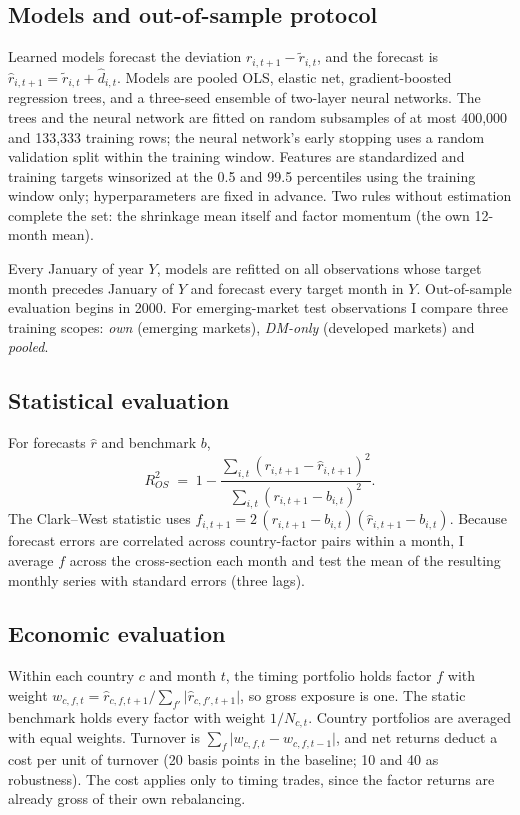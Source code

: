 \documentclass[11pt]{article}
\begin{document}
\subsection{Models and out-of-sample protocol}
Learned models forecast the deviation $r_{i,t+1} - \tilde r_{i,t}$, and the forecast is $\hat r_{i,t+1} = \tilde r_{i,t} + \hat d_{i,t}$. Models are pooled OLS, elastic net, gradient-boosted regression trees, and a three-seed ensemble of two-layer neural networks. The trees and the neural network are fitted on random subsamples of at most 400,000 and 133,333 training rows; the neural network's early stopping uses a random validation split within the training window. Features are standardized and training targets winsorized at the 0.5 and 99.5 percentiles using the training window only; hyperparameters are fixed in advance. Two rules without estimation complete the set: the shrinkage mean itself and factor momentum (the own 12-month mean).

Every January of year $Y$, models are refitted on all observations whose target month precedes January of $Y$ and forecast every target month in $Y$. Out-of-sample evaluation begins in 2000. For emerging-market test observations I compare three training scopes: \emph{own} (emerging markets), \emph{DM-only} (developed markets) and \emph{pooled}.

\subsection{Statistical evaluation}
For forecasts $\hat r$ and benchmark $b$,
\begin{equation}
R^2_{OS} \;=\; 1 - \frac{\sum_{i,t}\left(r_{i,t+1}-\hat r_{i,t+1}\right)^2}{\sum_{i,t}\left(r_{i,t+1}-b_{i,t}\right)^2}.
\end{equation}
The Clark--West statistic uses $f_{i,t+1} = 2\,(r_{i,t+1}-b_{i,t})(\hat r_{i,t+1}-b_{i,t})$. Because forecast errors are correlated across country-factor pairs within a month, I average $f$ across the cross-section each month and test the mean of the resulting monthly series with \citet{newey1987simple} standard errors (three lags).

\subsection{Economic evaluation}
Within each country $c$ and month $t$, the timing portfolio holds factor $f$ with weight $w_{c,f,t} = \hat r_{c,f,t+1} / \sum_{f'} \lvert \hat r_{c,f',t+1} \rvert$, so gross exposure is one. The static benchmark holds every factor with weight $1/N_{c,t}$. Country portfolios are averaged with equal weights. Turnover is $\sum_f \lvert w_{c,f,t} - w_{c,f,t-1} \rvert$, and net returns deduct a cost per unit of turnover (20 basis points in the baseline; 10 and 40 as robustness). The cost applies only to timing trades, since the factor returns are already gross of their own rebalancing.
\end{document}
